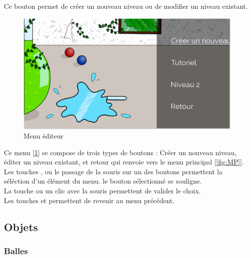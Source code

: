 Ce bouton permet de créer un nouveau niveau ou de modifier un niveau existant.

\newpage

\begin{figure} [!h]
    \centerline {\includegraphics[width=13cm]{figures/menu_editeur.png}}
    \caption {Menu éditeur}
    \label {fig:ME}
\end{figure}


\noindent Ce menu [\ref{fig:ME}] se compose de trois types de boutons : Créer un nouveau niveau, éditer un niveau existant,
 et retour qui renvoie vers le menu principal [\ref{fig:MP}].\\




\noindent Les touches \Touche{$\uparrow$} , \Touche{$\downarrow$} ou
le passage de la souris sur un des boutons permettent la séléction d'un élément du menu.
le bouton sélectionné se souligne.\\

\noindent La touche  ou un clic avec la souris permettent de valider le choix.\\

\noindent Les touches  et  permettent de revenir au menu précédent. \\

\subsection {Objets}

\label {OB}

\subsubsection{Balles}

